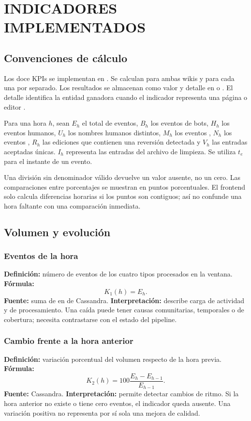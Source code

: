 \chapter{INDICADORES IMPLEMENTADOS}
\label{cap:kpis}
\section{Convenciones de cálculo}
Los doce KPIs se implementan en . Se calculan para ambas wikis y para cada una por separado. Los resultados se almacenan como valor y detalle en  o . El detalle identifica la entidad ganadora cuando el indicador representa una página o editor \cite{repo}.

Para una hora $h$, sean $E_h$ el total de eventos, $B_h$ los eventos de bots, $H_h$ los eventos humanos, $U_h$ los nombres humanos distintos, $M_h$ los eventos , $N_h$ los eventos , $R_h$ las ediciones que contienen una reversión detectada y $V_h$ las entradas aceptadas únicas. $I_h$ representa las entradas del archivo de limpieza. Se utiliza $t_e$ para el instante  de un evento.

Una división sin denominador válido devuelve un valor ausente, no un cero. Las comparaciones entre porcentajes se muestran en puntos porcentuales. El frontend solo calcula diferencias horarias si los puntos son contiguos; así no confunde una hora faltante con una comparación inmediata.

\section{Volumen y evolución}
\subsection{Eventos de la hora}
\textbf{Definición:} número de eventos de los cuatro tipos procesados en la ventana. \textbf{Fórmula:}
\[
K_1(h)=E_h.
\]
\textbf{Fuente:} suma de  en  de Cassandra. \textbf{Interpretación:} describe carga de actividad y de procesamiento. Una caída puede tener causas comunitarias, temporales o de cobertura; necesita contrastarse con el estado del pipeline.

\subsection{Cambio frente a la hora anterior}
\textbf{Definición:} variación porcentual del volumen respecto de la hora previa. \textbf{Fórmula:}
\[
K_2(h)=100\frac{E_h-E_{h-1}}{E_{h-1}}.
\]
\textbf{Fuente:} Cassandra. \textbf{Interpretación:} permite detectar cambios de ritmo. Si la hora anterior no existe o tiene cero eventos, el indicador queda ausente. Una variación positiva no representa por sí sola una mejora de calidad.

